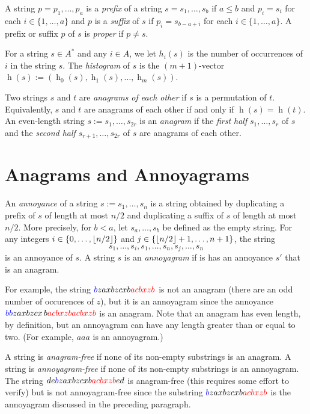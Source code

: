 \documentclass[kpfonts]{patmorin}
\DeclareMathOperator{\hist}{h}
\newcommand{\colored}[2]{{\color{#1}#2}}
\begin{document}
A string $p=p_1,\ldots,p_a$ is a \emph{prefix} of a string $s=s_1,\ldots,s_b$ if $a\le b$ and $p_i=s_i$ for each $i\in\{1,\ldots,a\}$ and $p$ is a \emph{suffix} of $s$ if $p_i=s_{b-a+i}$ for each $i\in\{1,\ldots,a\}$. A  prefix or suffix $p$ of $s$ is \emph{proper} if $p\neq s$.

For a string $s\in A^*$ and any $i\in A$, we let $h_i(s)$ is the number of occurrences of $i$ in the string $s$.  The \emph{histogram} of $s$ is the $(m+1)$-vector $\hist(s):=(\hist_0(s),\hist_1(s),\ldots,\hist_m(s))$.

Two strings $s$ and $t$ are \emph{anagrams of each other} if $s$ is a permutation of $t$.  Equivalently, $s$ and $t$ are anagrams of each other if and only if $\hist(s)=\hist(t)$.  An even-length string $s:=s_1,\ldots,s_{2r}$ is an \emph{anagram} if the \emph{first half} $s_1,\ldots,s_r$ of $s$ and the \emph{second half} $s_{r+1},\ldots,s_{2r}$ of $s$ are anagrams of each other.

\section{Anagrams and Annoyagrams}

An \emph{annoyance} of a string $s:=s_1,\ldots,s_n$ is a string obtained by duplicating a prefix of $s$ of length at most $n/2$ and duplicating a suffix of $s$ of length at most $n/2$.  More precisely, for $b <a$, let $s_a,\ldots,s_b$ be defined as the empty string.  For any integers $i\in\{0,\ldots,{\lfloor n/2 \rfloor}\}$ and $j\in\{{\lfloor n/2 \rfloor}+1,\ldots,n+1\}$, the string
\[
    s_1,\ldots,s_{i}, s_1,\ldots,s_n,s_{j},\ldots,s_n
\]
is an annoyance of $s$. A string $s$ is an \emph{annoyagram} if is has an annoyance $s'$ that is an anagram.

For example, the string $\colored{blue}{b}zaxbzcxb\colored{red}{acbxzb}$ is not an anagram (there are an odd number of occurences of $z$), but it is an annoyagram since the annoyance $\colored{blue}{bb}zaxbzcx\,b\colored{red}{acbxzb acbxzb}$ is an anagram.  Note that an anagram has even length, by definition, but an annoyagram can have any length greater than or equal to two. (For example, $aaa$ is an annoyagram.)

A string is \emph{anagram-free} if none of its non-empty substrings is an anagram. A string is \emph{annoyagram-free} if none of its non-empty substrings is an annoyagram. The string $de\colored{blue}{b}zaxbzcxb\colored{red}{acbxzb}ed$ is anagram-free (this requires some effort to verify) but is not annoyagram-free since the substring $\colored{blue}{b}zaxbzcxb\colored{red}{acbxzb}$ is the annoyagram discussed in the preceding paragraph.
\end{document}
